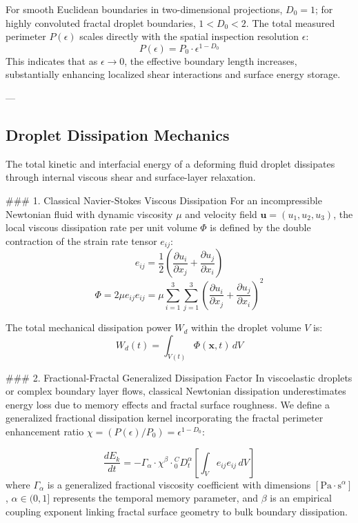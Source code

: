 \documentclass[11pt,a4paper]{article}
\begin{document}
For smooth Euclidean boundaries in two-dimensional projections, $D_0 = 1$; for highly convoluted fractal droplet boundaries, $1 < D_0 < 2$. The total measured perimeter $P(\epsilon)$ scales directly with the spatial inspection resolution $\epsilon$:
\begin{equation}
P(\epsilon) = P_0 \cdot \epsilon^{1 - D_0}
\end{equation}
This indicates that as $\epsilon \to 0$, the effective boundary length increases, substantially enhancing localized shear interactions and surface energy storage.

---

\subsection{Droplet Dissipation Mechanics}

The total kinetic and interfacial energy of a deforming fluid droplet dissipates through internal viscous shear and surface-layer relaxation.

### 1. Classical Navier-Stokes Viscous Dissipation
For an incompressible Newtonian fluid with dynamic viscosity $\mu$ and velocity field $\bm{u} = (u_1, u_2, u_3)$, the local viscous dissipation rate per unit volume $\Phi$ is defined by the double contraction of the strain rate tensor $e_{ij}$:
\begin{equation}
e_{ij} = \frac{1}{2} \left( \frac{\partial u_i}{\partial x_j} + \frac{\partial u_j}{\partial x_i} \right)
\end{equation}
\begin{equation}
\Phi = 2 \mu e_{ij} e_{ij} = \mu \sum_{i=1}^3 \sum_{j=1}^3 \left( \frac{\partial u_i}{\partial x_j} + \frac{\partial u_j}{\partial x_i} \right)^2
\end{equation}

The total mechanical dissipation power $W_d$ within the droplet volume $V$ is:
\begin{equation}
W_d(t) = \int_{V(t)} \Phi(\bm{x}, t) \, dV
\end{equation}

### 2. Fractional-Fractal Generalized Dissipation Factor
In viscoelastic droplets or complex boundary layer flows, classical Newtonian dissipation underestimates energy loss due to memory effects and fractal surface roughness. We define a generalized fractional dissipation kernel incorporating the fractal perimeter enhancement ratio $\chi = (P(\epsilon)/P_0) = \epsilon^{1-D_0}$:

\begin{equation}
\frac{dE_k}{dt} = -\Gamma_\alpha \cdot \chi^\beta \cdot {}_{0}^C D_t^\alpha \left[ \int_{V} e_{ij} e_{ij} \, dV \right]
\end{equation}
where $\Gamma_\alpha$ is a generalized fractional viscosity coefficient with dimensions $[\text{Pa} \cdot \text{s}^\alpha]$, $\alpha \in (0, 1]$ represents the temporal memory parameter, and $\beta$ is an empirical coupling exponent linking fractal surface geometry to bulk boundary dissipation.
\end{document}
